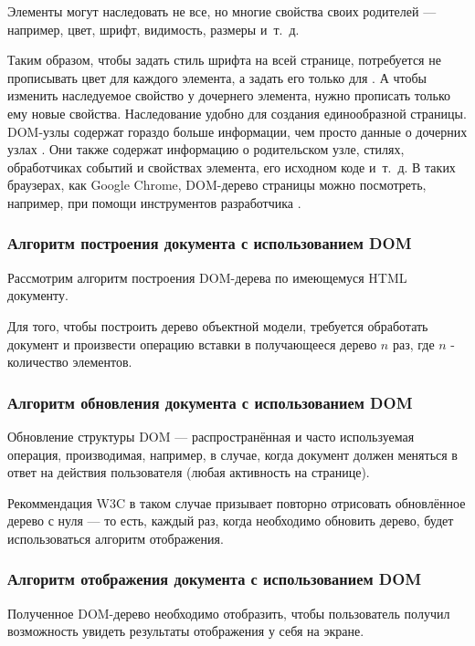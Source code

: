 \clearpage

Элементы могут наследовать не все, но многие свойства своих родителей --- например, цвет, шрифт, видимость, размеры и~т.~д.

Таким образом, чтобы задать стиль шрифта на всей странице, потребуется не прописывать цвет для каждого элемента, а задать его только для . 
А чтобы изменить наследуемое свойство у дочернего элемента, нужно прописать только ему новые свойства. 
Наследование удобно для создания единообразной страницы.
DOM-узлы содержат гораздо больше информации, чем просто данные о дочерних узлах \cite{dom-element}.
Они также содержат информацию о родительском узле, стилях, обработчиках событий и свойствах элемента, его исходном  коде и~т.~д.
В таких браузерах, как Google Chrome, DOM-дерево страницы можно посмотреть, например, при помощи инструментов разработчика \cite{devtools}.

\subsubsection{Алгоритм построения документа с использованием  DOM}


Рассмотрим алгоритм построения DOM-дерева по имеющемуся HTML документу.

Для того, чтобы построить дерево объектной модели, требуется обработать документ и произвести операцию вставки в получающееся дерево $n$ раз, где $n$ - количество элементов.

\subsubsection{Алгоритм обновления документа с использованием DOM}

Обновление структуры DOM --- распространённая и часто используемая операция, производимая, например, в случае, когда документ должен меняться в ответ на действия пользователя (любая активность на странице).

Рекоммендация W3C в таком случае призывает повторно отрисовать обновлённое дерево с нуля --- то есть, каждый раз, когда необходимо обновить дерево, будет использоваться алгоритм отображения.

\subsubsection{Алгоритм отображения документа с использованием DOM}

Полученное DOM-дерево необходимо отобразить, чтобы пользователь получил возможность увидеть результаты отображения у себя на экране.

